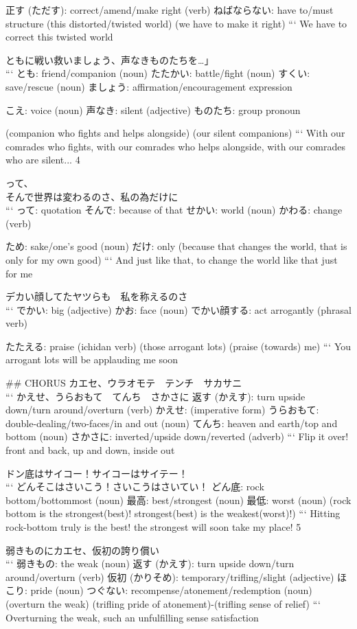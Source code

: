 正す (ただす): correct/amend/make right (verb)
ねばならない: have to/must structure
(this distorted/twisted world) (we have to make it right)
```
We have to correct this twisted world

ともに戦い救いましょう、声なきものたちを…」 \\
```
とも: friend/companion (noun)
たたかい: battle/fight (noun)
すくい: save/rescue (noun)
ましょう: affirmation/encouragement expression

こえ: voice (noun)
声なき: silent (adjective)
ものたち: group pronoun

(companion who fights and helps alongside) (our silent companions)
```
With our comrades who fights, with our comrades who helps alongside, with our comrades who are silent... {4}

って、 \\
そんで世界は変わるのさ、私の為だけに \\
```
って: quotation
そんで: because of that
せかい: world (noun)
かわる: change (verb)

ため: sake/one's good (noun)
だけ: only
(because that changes the world, that is only for my own good)
```
And just like that, to change the world like that just for me

デカい顔してたヤツらも　私を称えるのさ \\
```
でかい: big (adjective)
かお: face (noun)
でかい顔する: act arrogantly (phrasal verb)

たたえる: praise (ichidan verb)
(those arrogant lots) (praise (towards) me)
```
You arrogant lots will be applauding me soon

## CHORUS
カエセ、ウラオモテ　テンチ　サカサニ \\
```
かえせ、うらおもて　てんち　さかさに
返す (かえす): turn upside down/turn around/overturn (verb)
かえせ: (imperative form)
うらおもて: double-dealing/two-faces/in and out (noun)
てんち: heaven and earth/top and bottom (noun)
さかさに: inverted/upside down/reverted (adverb)
```
Flip it over! front and back, up and down, inside out

ドン底はサイコー！サイコーはサイテー！ \\
```
どんそこはさいこう！さいこうはさいてい！
どん底: rock bottom/bottommost (noun)
最高: best/strongest (noun)
最低: worst (noun)
(rock bottom is the strongest(best)! strongest(best) is the weakest(worst)!)
```
Hitting rock-bottom truly is the best! the strongest will soon take my place! {5}

弱きものにカエセ、仮初の誇り償い \\
```
弱きもの: the weak (noun)
返す (かえす): turn upside down/turn around/overturn (verb)
仮初 (かりそめ): temporary/trifling/slight (adjective)
ほこり: pride (noun)
つぐない: recompense/atonement/redemption (noun)
(overturn the weak) (trifling pride of atonement)-(trifling sense of relief)
```
Overturning the weak, such an unfulfilling sense satisfaction

